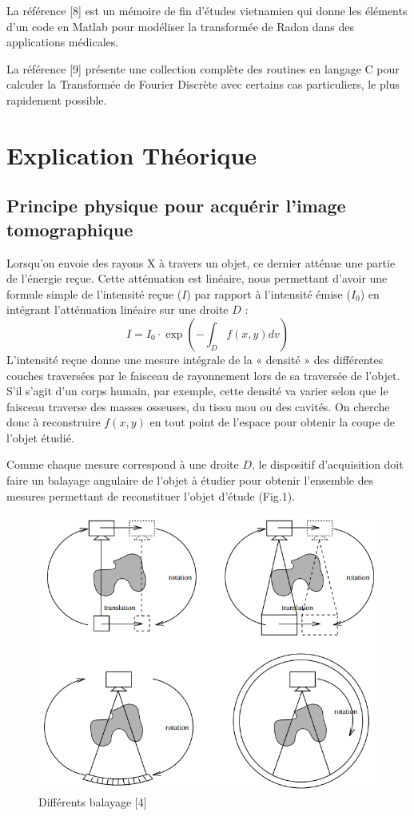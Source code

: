 \documentclass[conference]{IEEEtran}
\begin{document}
La référence [8] est un mémoire de fin d’études vietnamien qui donne les éléments d’un code en Matlab pour modéliser la transformée de Radon dans des applications médicales.
 
La référence [9] présente une collection complète des routines en langage C pour calculer la Transformée de Fourier Discrète avec certains cas particuliers, le plus rapidement possible.

\section{Explication Théorique}

\subsection{Principe physique pour acquérir l'image tomographique}

Lorsqu'on envoie des rayons X à travers un objet, ce dernier atténue une partie de l'énergie reçue.  Cette atténuation est linéaire, nous permettant d'avoir une formule simple de l'intensité reçue ($I$) par rapport à l'intensité émise ($I_0$) en intégrant l'atténuation linéaire sur une droite $D$ : \[
I=I_0 \cdot \exp(- \int_{D} f(x,y) dv )
\]
L’intensité reçue donne une mesure intégrale de la « densité » des différentes couches traversées par le faisceau de rayonnement lors de sa traversée de l’objet. S’il s’agit d’un corps humain, par exemple, cette densité va varier selon que le faisceau traverse des masses osseuses, du tissu mou ou des cavités.
On cherche donc à reconstruire $f(x,y)$ en tout point de l’espace pour obtenir la coupe de l’objet étudié.

Comme chaque mesure correspond à une droite $D$, le dispositif d'acquisition doit faire un balayage angulaire de l'objet à étudier pour obtenir l'ensemble des mesures permettant de reconstituer l'objet d'étude (Fig.1).

\begin{figure}[H]
\centering
\includegraphics[scale=0.4]{Balayage}
\caption[Balayage]{Différents balayage [4]}
\label{fig:gallery}
\end{figure}
\end{document}
